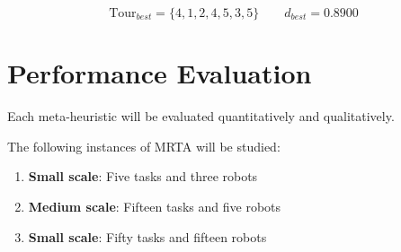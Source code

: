 \documentclass[a4paper]{article}
\begin{document}
$$
\text{Tour}_{best} = \{4, 1, 2, 4, 5, 3, 5\} \qquad d_{best} = 0.8900
$$

\section{Performance Evaluation}







Each meta-heuristic will be evaluated quantitatively and qualitatively.

The following instances of MRTA will be studied:
\begin{enumerate}
\item \textbf{Small scale}: Five tasks and three robots
\item \textbf{Medium scale}: Fifteen tasks and five robots
\item \textbf{Small scale}: Fifty tasks and fifteen robots
\end{enumerate}
\end{document}
